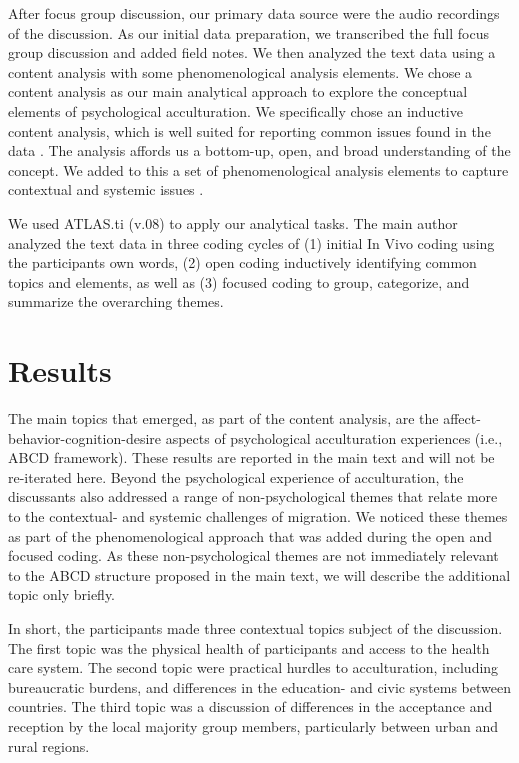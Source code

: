 \documentclass[man, 12pt, a4paper]{apa7}
\begin{document}
After focus group discussion, our primary data source were the audio recordings of the discussion. As our initial data preparation, we transcribed the full focus group discussion and added field notes. We then analyzed the text data using a content analysis with some phenomenological analysis elements. We chose a content analysis as our main analytical approach to explore the conceptual elements of psychological acculturation. We specifically chose an inductive content analysis, which is well suited for reporting common issues found in the data \citep[][]{Elo2008, Vaismoradi2013}. The analysis affords us a bottom-up, open, and broad understanding of the concept. We added to this a set of phenomenological analysis elements to capture contextual and systemic issues \citep[][]{Cresswell2018}. 

We used ATLAS.ti (v.08) to apply our analytical tasks. The main author analyzed the text data in three coding cycles of (1) initial In Vivo coding using the participants own words, (2) open coding inductively identifying common topics and elements, as well as (3) focused coding to group, categorize, and summarize the overarching themes. 

\section{Results}

The main topics that emerged, as part of the content analysis, are the affect-behavior-cognition-desire aspects of psychological acculturation experiences (i.e., ABCD framework). These results are reported in the main text and will not be re-iterated here. Beyond the psychological experience of acculturation, the discussants also addressed a range of non-psychological themes that relate more to the contextual- and systemic challenges of migration. We noticed these themes as part of the phenomenological approach that was added during the open and focused coding. As these non-psychological themes are not immediately relevant to the ABCD structure proposed in the main text, we will describe the additional topic only briefly. 

In short, the participants made three contextual topics subject of the discussion. The first topic was the physical health of participants and access to the health care system. The second topic were practical hurdles to acculturation, including bureaucratic burdens, and differences in the education- and civic systems between countries. The third topic was a discussion of differences in the acceptance and reception by the local majority group members, particularly between urban and rural regions.
\end{document}
